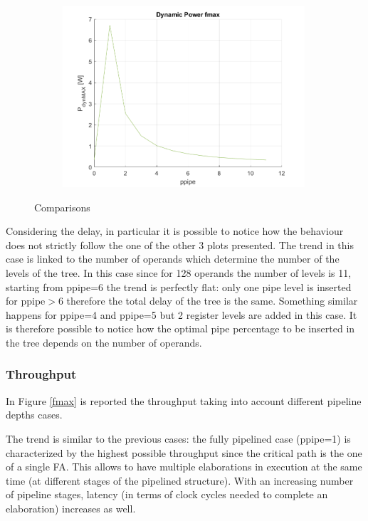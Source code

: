 \begin{figure}[H]
{\begin{subfigure}{0.55\textwidth}
		\end{subfigure}
		\begin{subfigure}{0.55\textwidth}
			\includegraphics[width=9cm]{immagini/radix2ppipe2/p_dyn_fmax_pipe.png}
		\end{subfigure}
	}
	\caption{Comparisons}
	\label{fig:ppipe}
\end{figure}
Considering the delay, in particular it is possible to notice how the behaviour does not strictly follow the one of the other 3 plots presented. The trend in this case is linked to the number of operands which determine the number of the levels of the tree. In this case since for 128 operands the number of levels is 11, starting from ppipe=6 the trend is perfectly flat: only one pipe level is inserted for ppipe$>$6 therefore the total delay of the tree is the same. Something similar happens for ppipe=4 and ppipe=5 but 2 register levels are added in this case.
It is therefore possible to notice how the optimal pipe percentage to be inserted in the tree depends on the number of operands.

\subsubsection{Throughput} In Figure \ref{fmax} is reported the throughput taking into account different pipeline depths cases. 

The trend is similar to the previous cases: the fully pipelined case (ppipe=1) is characterized by the highest possible throughput since the critical path is the one of a single FA. This allows to have multiple elaborations in execution at the same time (at different stages of the pipelined structure). With an increasing number of pipeline stages, latency (in terms of clock cycles needed to complete an elaboration) increases as well. 

